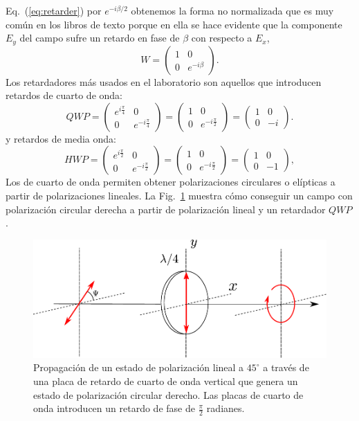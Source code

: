 Eq.~(\ref{eq:retarder}) por $e^{-i\beta/2} $ 
obtenemos la forma no normalizada que es muy común en los libros de
texto porque en ella se hace evidente que la componente $E_y$ del
campo sufre un retardo en fase de $\beta$ con respecto a $E_x$,  
\begin{equation*}
W = 
\begin{pmatrix}
1& 0 \\0&e^{-i\beta}  
\end{pmatrix}.
\label{eq:retarder_2}
\end{equation*}
Los retardadores más usados en el laboratorio son aquellos que
introducen retardos de cuarto de onda:
\begin{equation*}
QWP = \begin{pmatrix} e^{i\frac{\pi}{4}}  &0\\0&e^{-i\frac{\pi}{4}}\end{pmatrix}
=  \begin{pmatrix} 1 &0\\0&e^{-i\frac{\pi}{2}}\end{pmatrix}
=  \begin{pmatrix} 1 &0\\0&-i\end{pmatrix}.
\end{equation*}
y retardos de
media onda:
\begin{equation*}
HWP = \begin{pmatrix} e^{i\frac{\pi}{2}}
  &0\\0&e^{-i\frac{\pi}{2}}\end{pmatrix} =  \begin{pmatrix} 1
  &0\\0&e^{-i\frac{\pi}{2}}\end{pmatrix} =  \begin{pmatrix} 1 &0\\0&-1\end{pmatrix},
\end{equation*}
Los de cuarto de onda permiten obtener polarizaciones
circulares o elípticas a partir de polarizaciones lineales. La Fig.~\ref{fig:qwp_retarder} muestra cómo conseguir un campo con
polarización circular derecha a partir de polarización lineal y un 
retardador $QWP$.
\begin{figure}[h!]
\centering
\includegraphics[scale=.7]{qwp_retarder}
\caption[Generación de estados de polarización circulares]{Propagación de un estado de polarización lineal a
  $45^{\circ}$ a través de una placa de retardo de cuarto de onda
  vertical que genera un estado de polarización circular derecho. Las
placas de cuarto de onda introducen un retardo de fase de
$\frac{\pi}{2}$ radianes.}
\label{fig:qwp_retarder}
\end{figure}
